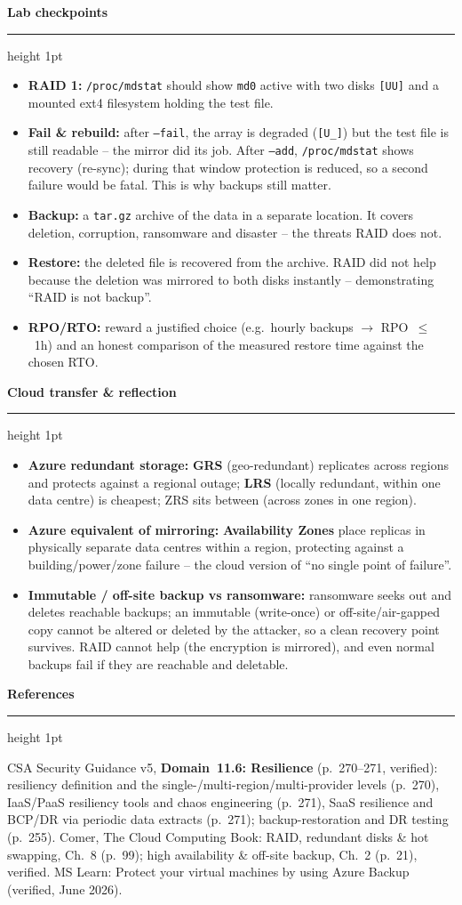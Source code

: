 \documentclass[11pt]{article}
\newcommand{\wbsection}[1]{\par\vspace{11pt}\noindent
  {\large\bfseries\color{kred}#1}\par\vspace{2pt}
  {\color{kred!35}\hrule height 1pt}\par\vspace{6pt}}
\renewcommand{\emph}[1]{\textup{#1}}
\newcommand{\cmd}[1]{\texttt{#1}}
\begin{document}
\wbsection{Lab checkpoints}
\begin{itemize}
\item \textbf{RAID 1:} \cmd{/proc/mdstat} should show \cmd{md0} active with two disks \cmd{[UU]} and a
      mounted ext4 filesystem holding the test file.
\item \textbf{Fail \& rebuild:} after \cmd{--fail}, the array is \emph{degraded} (\cmd{[U\_]}) but the
      test file is still readable -- the mirror did its job. After \cmd{--add}, \cmd{/proc/mdstat} shows
      \emph{recovery} (re-sync); during that window protection is reduced, so a second failure would be
      fatal. This is why backups still matter.
\item \textbf{Backup:} a \cmd{tar.gz} archive of the data in a separate location. It covers
      \emph{deletion, corruption, ransomware and disaster} -- the threats RAID does \emph{not}.
\item \textbf{Restore:} the deleted file is recovered from the archive. RAID did not help because the
      deletion was mirrored to both disks instantly -- demonstrating ``RAID is not backup''.
\item \textbf{RPO/RTO:} reward a justified choice (e.g.\ hourly backups $\rightarrow$ RPO~$\le$~1h) and an
      honest comparison of the measured restore time against the chosen RTO.
\end{itemize}

\wbsection{Cloud transfer \& reflection}
\begin{itemize}
\item \textbf{Azure redundant storage:} \textbf{GRS} (geo-redundant) replicates across \emph{regions} and
      protects against a regional outage; \textbf{LRS} (locally redundant, within one data centre) is
      cheapest; ZRS sits between (across zones in one region).
\item \textbf{Azure equivalent of mirroring:} \textbf{Availability Zones} place replicas in physically
      separate data centres within a region, protecting against a building/power/zone failure -- the
      cloud version of ``no single point of failure''.
\item \textbf{Immutable / off-site backup vs ransomware:} ransomware seeks out and deletes reachable
      backups; an \emph{immutable} (write-once) or off-site/air-gapped copy cannot be altered or deleted
      by the attacker, so a clean recovery point survives. RAID cannot help (the encryption is mirrored),
      and even normal backups fail if they are reachable and deletable.
\end{itemize}

\wbsection{References}
CSA Security Guidance v5, \textbf{Domain~11.6: Resilience} (p.~270--271, verified): resiliency definition
and the single-/multi-region/multi-provider levels (p.~270), IaaS/PaaS resiliency tools and chaos
engineering (p.~271), SaaS resilience and BCP/DR via periodic data extracts (p.~271); backup-restoration
and DR testing (p.~255). Comer, \emph{The Cloud Computing Book}: RAID, redundant disks \& hot swapping,
Ch.~8 (p.~99); high availability \& off-site backup, Ch.~2 (p.~21), verified. MS Learn: \emph{Protect your
virtual machines by using Azure Backup} (verified, June 2026).
\end{document}
